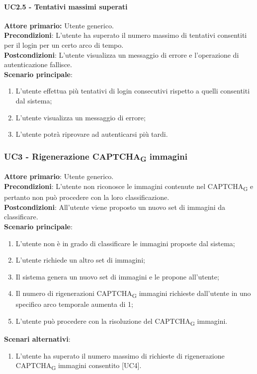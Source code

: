 \paragraph{UC2.5 - Tentativi massimi superati}
\textbf{Attore primario:} Utente generico.\\
\textbf{Precondizioni}: L'utente ha superato il numero massimo di tentativi consentiti per il login per un certo arco di tempo.\\
\textbf{Postcondizioni}: L’utente visualizza un messaggio di errore e l’operazione di autenticazione fallisce.\\

\textbf{Scenario principale}:
\begin{enumerate}
    \item L'utente effettua più tentativi di login consecutivi rispetto a quelli consentiti dal sistema;
	\item L’utente visualizza un messaggio di errore;
	\item L'utente potrà  riprovare ad autenticarsi più tardi.
\end{enumerate}

\subsubsection{UC3 - Rigenerazione CAPTCHA\textsubscript{G} immagini}
\textbf{Attore primario}: Utente generico.\\
\textbf{Precondizioni}: L'utente non riconosce le immagini contenute nel CAPTCHA\textsubscript{G} e pertanto non può procedere con la loro classificazione.\\
\textbf{Postcondizioni}: All'utente viene proposto un nuovo set di immagini da classificare.\\

\textbf{Scenario principale}:
\begin{enumerate}
   \item L'utente non è in grado di classificare le immagini proposte dal sistema;
   \item L'utente richiede un altro set di immagini;
   \item Il sistema genera un nuovo set di immagini e le propone all'utente;
   \item Il numero di rigenerazioni CAPTCHA\textsubscript{G} immagini richieste dall’utente in uno specifico arco temporale aumenta di 1;
   \item L'utente può procedere con la risoluzione del CAPTCHA\textsubscript{G} immagini.
\end{enumerate}
\textbf{Scenari alternativi}:
\begin{enumerate}
   \item L'utente ha superato il numero massimo di richieste di rigenerazione CAPTCHA\textsubscript{G} immagini consentito [UC4].
\end{enumerate}

